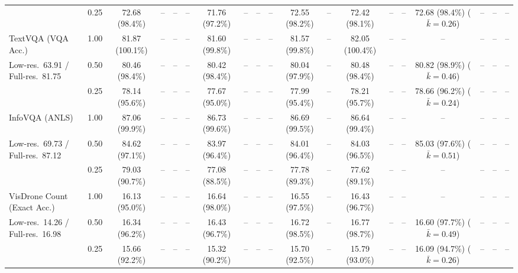 \begin{table}[t]
{\begin{tabular}{l c | c c c c | c c c c | c c | c c c | c c c c}
 & 0.25 & \cellcolor{gray!15}72.68 (98.4\%) & -- & -- & -- & 71.76 (97.2\%) & -- & -- & -- & \cellcolor{gray!15}72.55 (98.2\%) & -- & \cellcolor{gray!15}72.42 (98.1\%) & -- & -- & \cellcolor{gray!15}72.68 (98.4\%) {\footnotesize ($\bar k{=}0.26$)} & -- & -- & -- \\
\cmidrule(lr){1-19}
TextVQA (VQA Acc.) & 1.00 & \cellcolor{gray!15}81.87 (100.1\%) & -- & -- & -- & \cellcolor{gray!15}81.60 (99.8\%) & -- & -- & -- & \cellcolor{gray!15}81.57 (99.8\%) & -- & \cellcolor{gray!15}82.05 (100.4\%) & -- & -- & -- & -- & -- & -- \\
{\footnotesize Low-res.\ 63.91 / Full-res.\ 81.75} & 0.50 & \cellcolor{gray!15}80.46 (98.4\%) & -- & -- & -- & \cellcolor{gray!15}80.42 (98.4\%) & -- & -- & -- & 80.04 (97.9\%) & -- & \cellcolor{gray!15}80.48 (98.4\%) & -- & -- & \cellcolor{gray!15}80.82 (98.9\%) {\footnotesize ($\bar k{=}0.46$)} & -- & -- & -- \\
 & 0.25 & 78.14 (95.6\%) & -- & -- & -- & 77.67 (95.0\%) & -- & -- & -- & 77.99 (95.4\%) & -- & 78.21 (95.7\%) & -- & -- & 78.66 (96.2\%) {\footnotesize ($\bar k{=}0.24$)} & -- & -- & -- \\
\cmidrule(lr){1-19}
InfoVQA (ANLS) & 1.00 & \cellcolor{gray!15}87.06 (99.9\%) & -- & -- & -- & \cellcolor{gray!15}86.73 (99.6\%) & -- & -- & -- & \cellcolor{gray!15}86.69 (99.5\%) & -- & \cellcolor{gray!15}86.64 (99.4\%) & -- & -- & -- & -- & -- & -- \\
{\footnotesize Low-res.\ 69.73 / Full-res.\ 87.12} & 0.50 & 84.62 (97.1\%) & -- & -- & -- & 83.97 (96.4\%) & -- & -- & -- & 84.01 (96.4\%) & -- & 84.03 (96.5\%) & -- & -- & 85.03 (97.6\%) {\footnotesize ($\bar k{=}0.51$)} & -- & -- & -- \\
 & 0.25 & 79.03 (90.7\%) & -- & -- & -- & 77.08 (88.5\%) & -- & -- & -- & 77.78 (89.3\%) & -- & 77.62 (89.1\%) & -- & -- & -- & -- & -- & -- \\
\cmidrule(lr){1-19}
VisDrone Count (Exact Acc.) & 1.00 & 16.13 (95.0\%) & -- & -- & -- & 16.64 (98.0\%) & -- & -- & -- & 16.55 (97.5\%) & -- & 16.43 (96.7\%) & -- & -- & -- & -- & -- & -- \\
{\footnotesize Low-res.\ 14.26 / Full-res.\ 16.98} & 0.50 & 16.34 (96.2\%) & -- & -- & -- & 16.43 (96.7\%) & -- & -- & -- & \cellcolor{gray!15}16.72 (98.5\%) & -- & \cellcolor{gray!15}16.77 (98.7\%) & -- & -- & 16.60 (97.7\%) {\footnotesize ($\bar k{=}0.49$)} & -- & -- & -- \\
 & 0.25 & 15.66 (92.2\%) & -- & -- & -- & 15.32 (90.2\%) & -- & -- & -- & 15.70 (92.5\%) & -- & 15.79 (93.0\%) & -- & -- & 16.09 (94.7\%) {\footnotesize ($\bar k{=}0.26$)} & -- & -- & -- \\

\end{tabular}}
\end{table}
